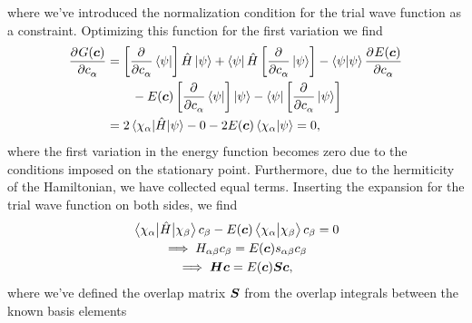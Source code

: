             where we've introduced the normalization condition for the trial
            wave function as a constraint.
            Optimizing this function for the first variation we find
            \begin{align}
                \dpd[]{G(\vfg{c})}{c_{\alpha}}
                &=
                \brak{
                    \dpd[]{}{c_{\alpha}}
                    \bra{\psi}
                }\hamil\ket{\psi}
                + \bra{\psi}\hamil
                \brak{
                    \dpd[]{}{c_{\alpha}}
                    \ket{\psi}
                }
                -
                \braket{\psi}{\psi}
                \dpd[]{E(\vfg{c})}{c_{\alpha}}
                \nonumber \\
                &\qquad
                -
                E(\vfg{c})
                \brak{
                    \dpd[]{}{c_{\alpha}}
                    \bra{\psi}
                }\ket{\psi}
                -
                \bra{\psi}
                \brak{
                    \dpd[]{}{c_{\alpha}}
                    \ket{\psi}
                }
                \\
                &=
                2 \mel{\chi_{\alpha}}{\hamil}{\psi}
                - 0
                - 2E(\vfg{c})\braket{\chi_{\alpha}}{\psi}
                = 0,
            \end{align}
            where the first variation in the energy function becomes zero due to
            the conditions imposed on the stationary point.
            Furthermore, due to the hermiticity of the Hamiltonian, we have
            collected equal terms.
            Inserting the expansion for the trial wave function on both sides,
            we find
            \begin{gather}
                \mel{\chi_{\alpha}}{\hat{H}}{\chi_{\beta}} c_{\beta}
                - E(\boldsymbol{c})\braket{\chi_{\alpha}}{\chi_{\beta}} c_{\beta}
                = 0
                \\
                \implies
                H_{\alpha\beta} c_{\beta}
                = E(\boldsymbol{c}) s_{\alpha\beta} c_{\beta}
                \\
                \implies
                \boldsymbol{H} \boldsymbol{c}
                = E(\boldsymbol{c}) \boldsymbol{S} \boldsymbol{c},
                \label{eq:variational-eigenvalue}
            \end{gather}
            where we've defined the overlap matrix $\boldsymbol{S}$ from the
            overlap integrals between the known basis elements
